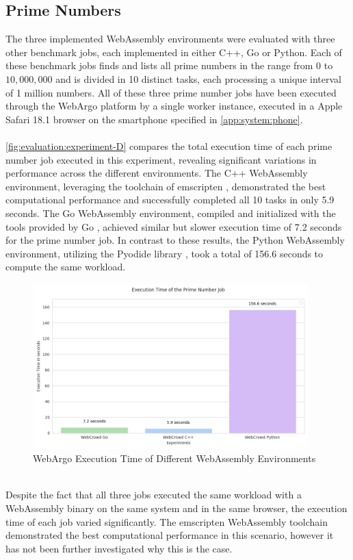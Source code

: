 \subsection{Prime Numbers}
The three implemented WebAssembly environments were evaluated with three other benchmark jobs, each implemented in either C++, Go or Python. Each of these benchmark jobs finds and lists all prime numbers in the range from $0$ to $10,000,000$ and is divided in 10 distinct tasks, each processing a unique interval of 1 million numbers. All of these three prime number jobs have been executed through the WebArgo platform by a single worker instance, executed in a Apple Safari 18.1 \cite{evaluation:safari} browser on the smartphone specified in \autoref{app:system:phone}.
\\~\\
\autoref{fig:evaluation:experiment-D} compares the total execution time of each prime number job executed in this experiment, revealing significant variations in performance across the different environments. The C++ WebAssembly environment, leveraging the toolchain of emscripten \cite{methodology:emcc}, demonstrated the best computational performance and successfully completed all 10 tasks in only 5.9 seconds. The Go WebAssembly environment, compiled and initialized with the tools provided by Go \cite{methodology:go}, achieved similar but slower execution time of 7.2 seconds for the prime number job. In contrast to these results, the Python WebAssembly environment, utilizing the Pyodide library \cite{methodology:pyodie}, took a total of 156.6 seconds to compute the same workload.
\begin{figure}[htbp]
    \centering
    \includegraphics[width=0.95\textwidth]{gfx/figures/Evaluation_D.png}
    \caption{WebArgo Execution Time of Different WebAssembly Environments}
    \label{fig:evaluation:experiment-D}
\end{figure}
~\\
Despite the fact that all three jobs executed the same workload with a WebAssembly binary on the same system and in the same browser, the execution time of each job varied significantly. The emscripten \cite{methodology:emcc} WebAssembly toolchain demonstrated the best computational performance in this scenario, however it has not been further investigated why this is the case.

